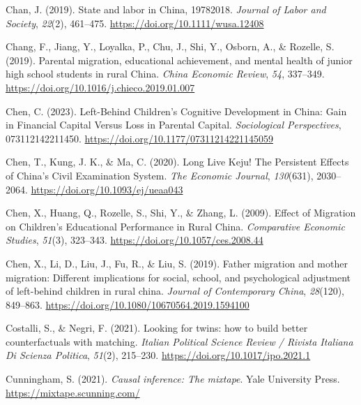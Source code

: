 \documentclass[
  man,floatsintext]{apa7}
\newlength{\cslhangindent}
\newlength{\cslentryspacingunit} %
\newenvironment{CSLReferences}[2] %
 {%
  \setlength{\parindent}{0pt}
  \ifodd #1
  \let\oldpar\par
  \def\par{\hangindent=\cslhangindent\oldpar}
  \fi
  \setlength{\parskip}{#2\cslentryspacingunit}
 }%
 {}
\begin{document}
\begin{CSLReferences}{1}{0}
\leavevmode{}%
Chan, J. (2019). State and labor in China, 1978{\textendash}2018. \emph{Journal of Labor and Society}, \emph{22}(2), 461--475. \url{https://doi.org/10.1111/wusa.12408}

\leavevmode{}%
Chang, F., Jiang, Y., Loyalka, P., Chu, J., Shi, Y., Osborn, A., \& Rozelle, S. (2019). Parental migration, educational achievement, and mental health of junior high school students in rural China. \emph{China Economic Review}, \emph{54}, 337--349. \url{https://doi.org/10.1016/j.chieco.2019.01.007}

\leavevmode{}%
Chen, C. (2023). Left-Behind Children{'}s Cognitive Development in China: Gain in Financial Capital Versus Loss in Parental Capital. \emph{Sociological Perspectives}, 073112142211450. \url{https://doi.org/10.1177/07311214221145059}

\leavevmode{}%
Chen, T., Kung, J. K., \& Ma, C. (2020). Long Live Keju! The Persistent Effects of China{'}s Civil Examination System. \emph{The Economic Journal}, \emph{130}(631), 2030--2064. \url{https://doi.org/10.1093/ej/ueaa043}

\leavevmode{}%
Chen, X., Huang, Q., Rozelle, S., Shi, Y., \& Zhang, L. (2009). Effect of Migration on Children's Educational Performance in Rural China. \emph{Comparative Economic Studies}, \emph{51}(3), 323--343. \url{https://doi.org/10.1057/ces.2008.44}

\leavevmode{}%
Chen, X., Li, D., Liu, J., Fu, R., \& Liu, S. (2019). Father migration and mother migration: Different implications for social, school, and psychological adjustment of left-behind children in rural china. \emph{Journal of Contemporary China}, \emph{28}(120), 849--863. \url{https://doi.org/10.1080/10670564.2019.1594100}

\leavevmode{}%
Costalli, S., \& Negri, F. (2021). Looking for twins: how to build better counterfactuals with matching. \emph{Italian Political Science Review / Rivista Italiana Di Scienza Politica}, \emph{51}(2), 215--230. \url{https://doi.org/10.1017/ipo.2021.1}

\leavevmode{}%
Cunningham, S. (2021). \emph{Causal inference: The mixtape}. Yale University Press. \url{https://mixtape.scunning.com/}


\end{CSLReferences}
\end{document}
